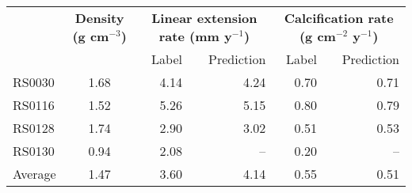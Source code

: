 \begin{tabular}{@{}lrrrrrr@{}}
\toprule
         & \multicolumn{2}{c}{\textbf{Density (g cm$^{-3}$)}} & \multicolumn{2}{c}{\textbf{Linear extension rate (mm y$^{-1}$)}} & \multicolumn{2}{c}{\textbf{Calcification rate (g cm$^{-2}$ y$^{-1}$)}} \\ 
         &                             &                      &  \quad\quad\quad    Label &       Prediction\quad\quad\quad\quad &        \quad\quad\quad    Label &       Prediction\quad\quad\quad\quad \\ \midrule 
RS0030   &          \multicolumn{2}{c}{1.68}                  &                     4.14  &             4.24\quad\quad\quad\quad &                            0.70 &             0.71\quad\quad\quad\quad \\
RS0116   &          \multicolumn{2}{c}{1.52}                  &                     5.26  &             5.15\quad\quad\quad\quad &                            0.80 &             0.79\quad\quad\quad\quad \\
RS0128   &          \multicolumn{2}{c}{1.74}                  &                     2.90  &             3.02\quad\quad\quad\quad &                            0.51 &             0.53\quad\quad\quad\quad \\
RS0130   &          \multicolumn{2}{c}{0.94}                  &                     2.08  &               --\quad\quad\quad\quad &                            0.20 &               --\quad\quad\quad\quad \\ \midrule
Average  &          \multicolumn{2}{c}{1.47}                  &                     3.60  &             4.14\quad\quad\quad\quad &                            0.55 &             0.51\quad\quad\quad\quad \\ \bottomrule
\end{tabular}